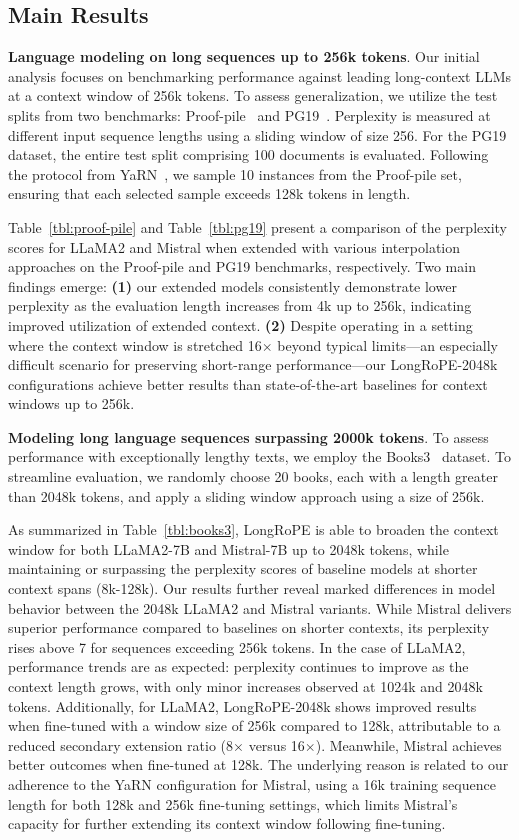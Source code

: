 \subsection{Main Results}

\label{sec:mainresult}
\textbf{Language modeling on long sequences up to 256k tokens}. Our initial analysis focuses on benchmarking performance against leading long-context LLMs at a context window of 256k tokens. To assess generalization, we utilize the test splits from two benchmarks: Proof-pile~\cite{pg19} and PG19~\cite{pile}. Perplexity is measured at different input sequence lengths using a sliding window of size 256. For the PG19 dataset, the entire test split comprising 100 documents is evaluated. Following the protocol from YaRN~\cite{yarn}, we sample 10 instances from the Proof-pile set, ensuring that each selected sample exceeds 128k tokens in length.

Table~\ref{tbl:proof-pile} and Table~\ref{tbl:pg19} present a comparison of the perplexity scores for LLaMA2 and Mistral when extended with various interpolation approaches on the Proof-pile and PG19 benchmarks, respectively. Two main findings emerge: \textbf{(1)} our extended models consistently demonstrate lower perplexity as the evaluation length increases from 4k up to 256k, indicating improved utilization of extended context. \textbf{(2)} Despite operating in a setting where the context window is stretched 16$\times$ beyond typical limits—an especially difficult scenario for preserving short-range performance—our LongRoPE-2048k configurations achieve better results than state-of-the-art baselines for context windows up to 256k.

\textbf{Modeling long language sequences surpassing 2000k tokens}. To assess performance with exceptionally lengthy texts, we employ the Books3~\cite{pile} dataset. To streamline evaluation, we randomly choose 20 books, each with a length greater than 2048k tokens, and apply a sliding window approach using a size of 256k.

As summarized in Table~\ref{tbl:books3}, LongRoPE is able to broaden the context window for both LLaMA2-7B and Mistral-7B up to 2048k tokens, while maintaining or surpassing the perplexity scores of baseline models at shorter context spans (8k-128k). Our results further reveal marked differences in model behavior between the 2048k LLaMA2 and Mistral variants. While Mistral delivers superior performance compared to baselines on shorter contexts, its perplexity rises above 7 for sequences exceeding 256k tokens. In the case of LLaMA2, performance trends are as expected: perplexity continues to improve as the context length grows, with only minor increases observed at 1024k and 2048k tokens. Additionally, for LLaMA2, LongRoPE-2048k shows improved results when fine-tuned with a window size of 256k compared to 128k, attributable to a reduced secondary extension ratio (8$\times$ versus 16$\times$). Meanwhile, Mistral achieves better outcomes when fine-tuned at 128k. The underlying reason is related to our adherence to the YaRN configuration for Mistral, using a 16k training sequence length for both 128k and 256k fine-tuning settings, which limits Mistral's capacity for further extending its context window following fine-tuning.

